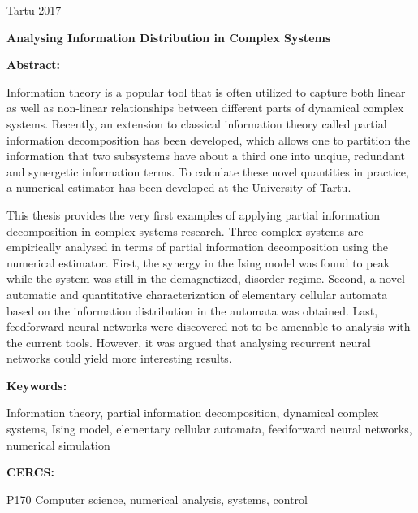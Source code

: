 \documentclass[12pt]{article}
\begin{document}
\vfill
\centerline{Tartu 2017}



\newpage 
\noindent\textbf{\large Analysing Information Distribution in Complex Systems}

\vspace*{3ex}

\noindent\textbf{Abstract:} 

\noindent
Information theory is a popular tool that is often utilized to capture both linear as well as non-linear relationships between different parts of dynamical complex systems. Recently, an extension to classical information theory called partial information decomposition has been developed, which allows one to partition the information that two subsystems have about a third one into unqiue, redundant and synergetic information terms. To calculate these novel quantities in practice, a numerical estimator has been developed at the University of Tartu. 

This thesis provides the very first examples of applying partial information decomposition in complex systems research. Three complex systems are empirically analysed in terms of partial information decomposition using the numerical estimator. First, the synergy in the Ising model was found to peak while the system was still in the demagnetized, disorder regime. Second, a novel automatic and quantitative characterization of elementary cellular automata based on the information distribution in the automata was obtained. Last, feedforward neural networks were discovered not to be amenable to analysis with the current tools. However, it was argued that analysing recurrent neural networks could yield more interesting results. 

\vspace*{1ex}

\noindent\textbf{Keywords:} 

Information theory, partial information decomposition, dynamical complex systems, Ising model, elementary cellular automata, feedforward neural networks, numerical simulation

\vspace*{1ex}

\noindent\textbf{CERCS:} 

P170 Computer science, numerical analysis, systems, control

\vspace*{3ex}
\end{document}
